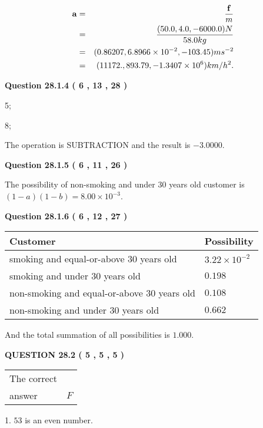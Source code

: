 \documentclass[12pt]{article}
\begin{document}
\begin{eqnarray*}
\mathbf{a}&=&\frac{\mathbf{f}}m  \\
&=&\frac{(
50.0 ,
4.0 ,
-6000.0 )N
}{ %
58.0 kg}  \\
&=&(
0.86207 ,
6.8966 \times 10^{-2},
-103.45
)ms^{-2} \\
&=&(
11172. ,
893.79 ,
-1.3407 \times 10^{6}
)km/h^2.
\end{eqnarray*}
 
  
  
{\textbf{\large{Question
28.1.4 
 (           6 ,          13 ,          28 )
}}}

5;
 
8;
 
The operation is  %
SUBTRACTION and the result is
$ %
-3.0000$.
 
  
  
{\textbf{\large{Question
28.1.5 
 (           6 ,          11 ,          26 )
}}}

The possibility of  %
 non-smoking and  %
under 30 years old
customer is $ (1-a)(1-b) =  %
8.00 \times 10^{-3} $.
  
  
{\textbf{\large{Question
28.1.6 
 (           6 ,          12 ,          27 )
}}}

 
\noindent
\begin{tabular}{|l|l|}
\hline
Customer & Possibility \\
\hline
smoking  and  %
equal-or-above 30 years old &
  $ %
3.22 \times 10^{-2}$ \\
\hline
smoking  and  %
under 30 years old &
  $ %
0.198$ \\
\hline
 non-smoking and  %
equal-or-above 30 years old &
  $ %
0.108$ \\
\hline
 non-smoking and  %
under 30 years old &
  $ %
0.662$ \\
\hline
\end{tabular}
 
\noindent
 And the total summation of all possibilities is $  %
1.000 $.
 
  
  
{\textbf{\large{QUESTION
28.2 
 (           5 ,           5 ,           5 )
}}}

 
\noindent\begin{tabular}{|l|l|}\hline The correct & \\
          answer &  %
$F$ \\ \hline \end{tabular}
1. $ %
53$ is an  %
even number.
 
\end{document}
